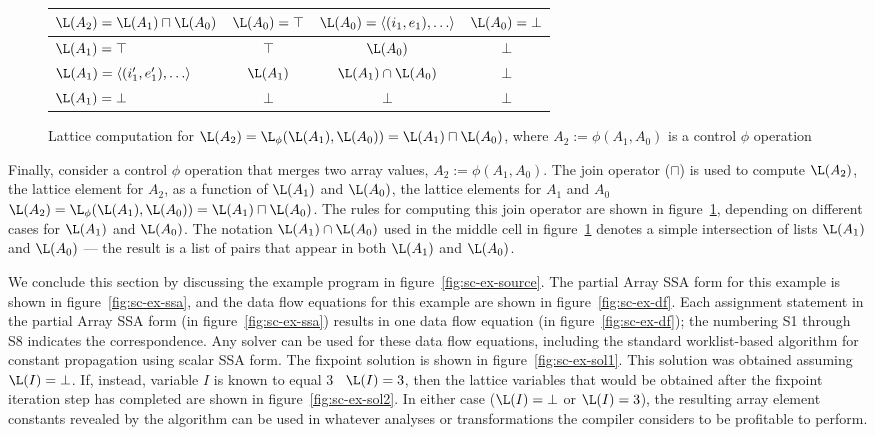 \begin{figure}%
\begin{center}
\begin{tabular}{|l||c|c|c|}
\hline
$\L(A_2) = \L(A_1) \sqcap \L(A_0) $ & $\L(A_0) = \top$ & $\L(A_0) = \langle (i_1,e_1), \ldots \rangle $ & $\L(A_0) = \bot$ \\
\hline \hline
$\L(A_1) = \top$ & $\top$ & $\L(A_0)$ & $\bot$ \\
\hline
$\L(A_1) = \langle(i'_1,e'_1), \ldots\rangle$ & $\L(A_1)$ & $\L(A_1) \cap \L(A_0)$ & $\bot$ \\
\hline
$\L(A_1) = \bot$ & $\bot$ & $\bot$ & $\bot$ \\
\hline
\end{tabular}
\end{center}
\caption{Lattice computation for 
$\L(A_2) = \L_{\phi}(\L(A_1), \L(A_0)) = \L(A_1) \sqcap \L(A_0) $,
where $A_2 := \phi(A_1, A_0)$ is
a control $\phi$ operation}
\label{fig:join}
\end{figure}

Finally,
consider a control $\phi$ operation that merges two array values, $A_2 := \phi(A_1, A_0)$.
The join operator ($\sqcap$) is used to compute $\L(A_2)$,
the lattice element for $A_2$, as a function of 
$\L(A_1)$ and $\L(A_0)$,
the lattice elements for $A_1$ and $A_0$ 
\ie\ $\L(A_2) = \L_{\phi}(\L(A_1), \L(A_0)) = \L(A_1) \sqcap \L(A_0)$.
The rules for computing this
join operator are shown in figure~\ref{fig:join}, depending on
different cases for $\L(A_1)$ and $\L(A_0)$.
The notation $\L(A_1) \cap \L(A_0)$ used in the middle cell in
figure~\ref{fig:join} denotes a simple intersection of lists $\L(A_1)$ and 
$\L(A_0)$  --- the result is a list of pairs that appear in both
$\L(A_1)$ and 
$\L(A_0)$.


We conclude this section by discussing the
example program in figure~\ref{fig:sc-ex-source}.  The
partial Array SSA form for this example is shown in
figure~\ref{fig:sc-ex-ssa}, and 
the data
flow equations for this example are shown in
figure~\ref{fig:sc-ex-df}. Each assignment statement
in the partial Array SSA form
(in figure~\ref{fig:sc-ex-ssa})
results in one data flow equation
(in figure~\ref{fig:sc-ex-df}); the numbering S1 through S8
indicates the correspondence.
Any solver can be used for these data flow equations, including the
standard worklist-based algorithm for constant propagation using
scalar SSA form.
The fixpoint solution is shown in
figure~\ref{fig:sc-ex-sol1}.
This solution was obtained assuming $\L(I) = \bot$.  If, instead,
variable $I$ is known to equal 3 \ie\ $\L(I) = 3$, then 
the lattice variables that would be obtained
after the fixpoint iteration step has completed are shown in
figure~\ref{fig:sc-ex-sol2}.
In either case ($\L(I) = \bot$ or $\L(I) = 3$), the resulting array
element constants
revealed by the algorithm can be used in whatever analyses or
transformations the compiler considers to 
be profitable to perform. 



